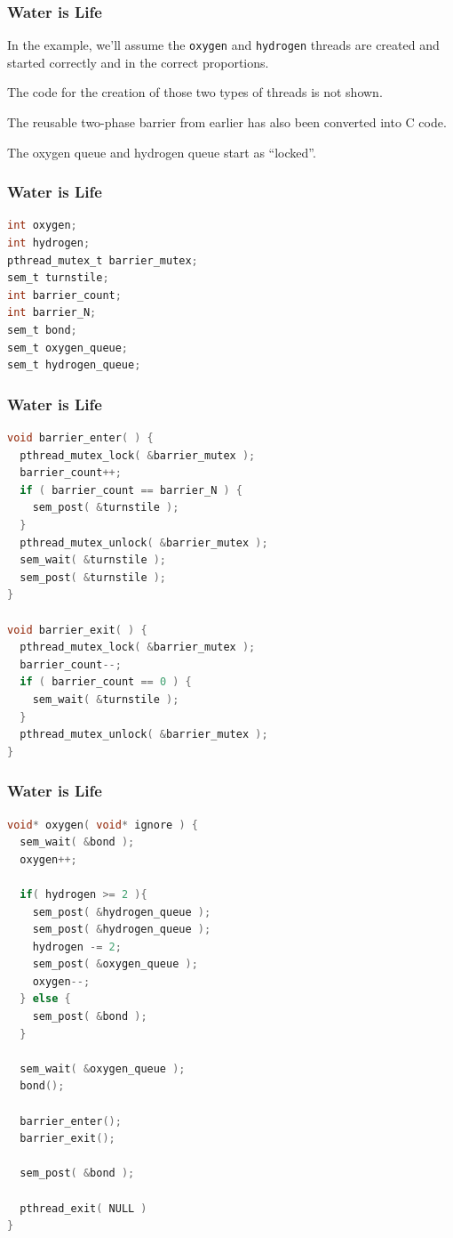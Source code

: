 \begin{frame}
	\frametitle{Water is Life}

	In the example, we'll assume the \texttt{oxygen} and \texttt{hydrogen} threads are created and started correctly and in the correct proportions.

	The code for the creation of those two types of threads is not shown.

	The reusable two-phase barrier from earlier has also been converted into C code.

	The oxygen queue and hydrogen queue start as ``locked''.

\end{frame}

\begin{frame}[fragile]
	\frametitle{Water is Life}

	\begin{lstlisting}[language=C]
int oxygen;
int hydrogen;
pthread_mutex_t barrier_mutex;
sem_t turnstile;
int barrier_count;
int barrier_N;
sem_t bond;
sem_t oxygen_queue;
sem_t hydrogen_queue;
\end{lstlisting}
\end{frame}

\begin{frame}[fragile]
	\frametitle{Water is Life}

	\begin{lstlisting}[language=C]
void barrier_enter( ) {
  pthread_mutex_lock( &barrier_mutex );
  barrier_count++;
  if ( barrier_count == barrier_N ) {
    sem_post( &turnstile );
  }
  pthread_mutex_unlock( &barrier_mutex );
  sem_wait( &turnstile );
  sem_post( &turnstile );            
}

void barrier_exit( ) {
  pthread_mutex_lock( &barrier_mutex );
  barrier_count--;
  if ( barrier_count == 0 ) {
    sem_wait( &turnstile );
  }
  pthread_mutex_unlock( &barrier_mutex );
}
\end{lstlisting}

\end{frame}

\begin{frame}[fragile]
	\frametitle{Water is Life}

	\begin{lstlisting}[language=C]
void* oxygen( void* ignore ) {
  sem_wait( &bond );
  oxygen++;
  
  if( hydrogen >= 2 ){
    sem_post( &hydrogen_queue );
    sem_post( &hydrogen_queue );
    hydrogen -= 2;
    sem_post( &oxygen_queue );
    oxygen--;
  } else {
    sem_post( &bond );
  }
  
  sem_wait( &oxygen_queue );
  bond();

  barrier_enter();
  barrier_exit();

  sem_post( &bond );
  
  pthread_exit( NULL )
}
\end{lstlisting}
\end{frame}


